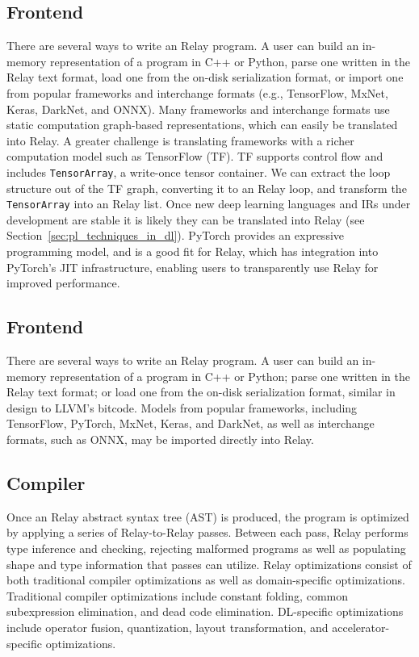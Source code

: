 \subsection{Frontend}

There are several ways to write an Relay program.
A user can build an in-memory representation of
    a program in C++ or Python,
    parse one written in the Relay text format,
    load one from the on-disk serialization format,
    or import one from popular frameworks and interchange formats
    (e.g., TensorFlow, MxNet, Keras, DarkNet, and ONNX).
Many frameworks and interchange formats use static computation graph-based representations,
    which can easily be translated into Relay.
A greater challenge is translating frameworks
    with a richer computation model such as TensorFlow (TF).
TF supports control flow and includes \verb|TensorArray|, a write-once
    tensor container.
We can extract the loop structure out of the TF graph, converting
    it to an Relay loop, and transform the \verb|TensorArray| into an Relay list.
Once new deep learning languages and IRs under development
    are stable it is likely they can be translated into Relay (see
    Section~\ref{sec:pl_techniques_in_dl}).
PyTorch provides an expressive programming model, and is a good fit
    for Relay, which has integration into PyTorch's JIT infrastructure,
    enabling users to transparently use Relay for improved performance.


    \subsection{Frontend}

    There are several ways to write an Relay program.
    A user can build an in-memory representation of
      a program in C++ or Python;
      parse one written in the Relay text format;
      or load one from the on-disk serialization format,
      similar in design to LLVM's bitcode.
    Models from popular frameworks, including
      TensorFlow, PyTorch, MxNet, Keras, and DarkNet, as well as interchange
      formats, such as ONNX, may be imported directly into Relay.
    \subsection{Compiler}
    Once an Relay abstract syntax tree (AST) is produced,
      the program is optimized by applying a series of Relay-to-Relay
      passes.
    Between each pass, Relay performs type inference and checking,
      rejecting malformed programs as well as populating shape and type
      information that passes can utilize.
    Relay optimizations consist of both traditional compiler
      optimizations as well as domain-specific optimizations.
    Traditional compiler optimizations include constant folding,
      common subexpression elimination,
      and dead code elimination.
    DL-specific optimizations include
      operator fusion,
      quantization,
      layout transformation,
      and accelerator-specific optimizations.

